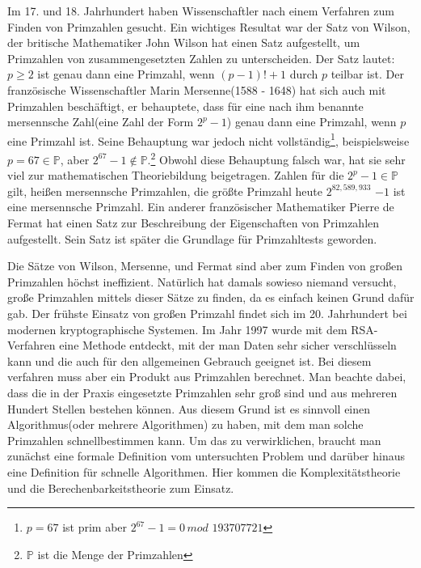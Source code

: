 \documentclass[12pt,oneside]{article}
\theoremstyle{remark}
\theoremstyle{definition}
\begin{document}
Im 17. und 18. Jahrhundert haben Wissenschaftler nach einem Verfahren zum Finden von Primzahlen gesucht. Ein wichtiges Resultat war der Satz von Wilson, der britische Mathematiker John Wilson hat einen Satz aufgestellt, um Primzahlen von zusammengesetzten Zahlen zu unterscheiden. Der Satz lautet: $p \geq 2$ ist genau dann eine Primzahl, wenn $(p - 1)! + 1$ durch $p$ teilbar ist. Der französische Wissenschaftler Marin Mersenne(1588 - 1648) hat sich auch mit Primzahlen beschäftigt, er behauptete, dass für eine nach ihm benannte mersennsche Zahl(eine Zahl der Form $2^p - 1$) genau dann eine Primzahl, wenn $p$ eine Primzahl ist. Seine Behauptung war jedoch nicht vollständig\footnote{$p = 67$ ist prim aber $2^{67} - 1 = 0 \, mod \, \, 193707721$}, beispielsweise $ p = 67 \in \mathbb{P}$, aber $2^{67} - 1 \not \in \mathbb{P}$.\footnote{$\mathbb{P}$ ist die Menge der Primzahlen} Obwohl diese Behauptung falsch war, hat sie sehr viel zur mathematischen Theoriebildung beigetragen. Zahlen für die $2^p - 1 \in \mathbb{P}$ gilt, heißen mersennsche Primzahlen, die größte Primzahl heute $2^{82,589,933}$ $ - 1$ ist eine mersennsche Primzahl. Ein anderer französischer Mathematiker Pierre de Fermat hat einen Satz zur Beschreibung der Eigenschaften von Primzahlen aufgestellt. Sein Satz ist später die Grundlage für Primzahltests geworden.
\newline

Die Sätze von Wilson, Mersenne, und Fermat sind aber zum Finden von großen Primzahlen höchst ineffizient. Natürlich hat damals sowieso niemand versucht, große Primzahlen mittels dieser Sätze zu finden, da es einfach keinen Grund dafür gab. Der frühste Einsatz von großen Primzahl findet sich im 20. Jahrhundert bei modernen kryptographische Systemen\cite{krypWiki}. Im Jahr 1997 wurde mit dem RSA-Verfahren eine Methode entdeckt, mit der man Daten sehr sicher verschlüsseln kann und die auch für den allgemeinen Gebrauch geeignet ist. Bei diesem verfahren muss aber ein Produkt aus Primzahlen berechnet\cite{rsa}. Man beachte dabei, dass die in der Praxis eingesetzte Primzahlen sehr groß sind und aus mehreren Hundert Stellen bestehen können. Aus diesem Grund ist es sinnvoll einen Algorithmus(oder mehrere Algorithmen) zu haben, mit dem man solche Primzahlen \textquotedbl schnell\textquotedbl bestimmen kann. Um das zu verwirklichen, braucht man zunächst eine formale Definition vom untersuchten Problem und darüber hinaus eine Definition für schnelle Algorithmen. Hier kommen die Komplexitätstheorie und die Berechenbarkeitstheorie zum Einsatz. 
\end{document}
